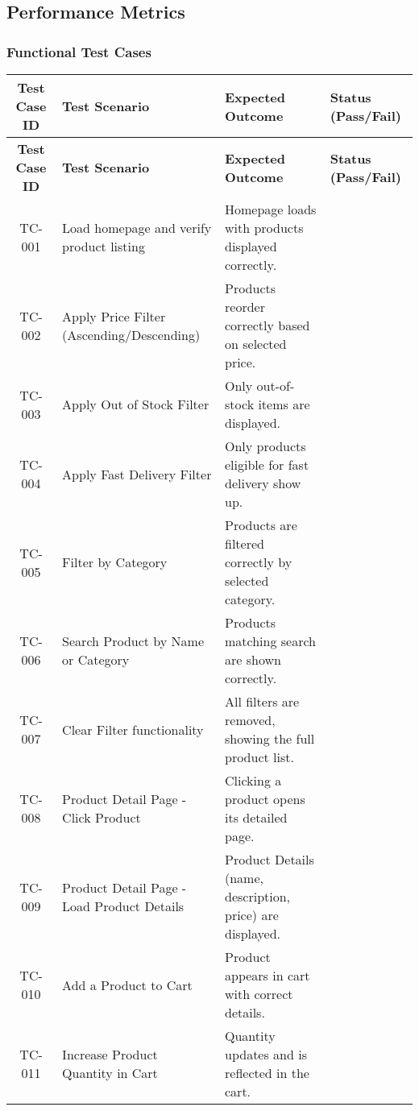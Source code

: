 \documentclass{llncs}
\begin{document}
\subsection{Performance Metrics}

\subsubsection{Functional Test Cases}

\renewcommand{\arraystretch}{1.3} %

\begin{longtable}{|c|>{\raggedright}p{6cm}|p{7cm}|p{2cm}|}
\hline
\textbf{Test Case ID} & \textbf{Test Scenario} & \textbf{Expected Outcome} & \textbf{Status (Pass/Fail)} \\ \hline
\endfirsthead
\hline
\textbf{Test Case ID} & \textbf{Test Scenario} & \textbf{Expected Outcome} & \textbf{Status (Pass/Fail)} \\ \hline
\endhead
TC-001 & Load homepage and verify product listing & Homepage loads with products displayed correctly. & \\ \hline
TC-002 & Apply Price Filter (Ascending/Descending) & Products reorder correctly based on selected price. & \\ \hline
TC-003 & Apply Out of Stock Filter & Only out-of-stock items are displayed. & \\ \hline
TC-004 & Apply Fast Delivery Filter & Only products eligible for fast delivery show up. & \\ \hline
TC-005 & Filter by Category & Products are filtered correctly by selected category. & \\ \hline
TC-006 & Search Product by Name or Category & Products matching search are shown correctly. & \\ \hline
TC-007 & Clear Filter functionality & All filters are removed, showing the full product list. & \\ \hline
TC-008 & Product Detail Page - Click Product & Clicking a product opens its detailed page. & \\ \hline
TC-009 & Product Detail Page - Load Product Details & Product Details (name, description, price) are displayed. & \\ \hline
TC-010 & Add a Product to Cart & Product appears in cart with correct details. & \\ \hline
TC-011 & Increase Product Quantity in Cart & Quantity updates and is reflected in the cart. & \\ \hline

\end{longtable}
\end{document}
